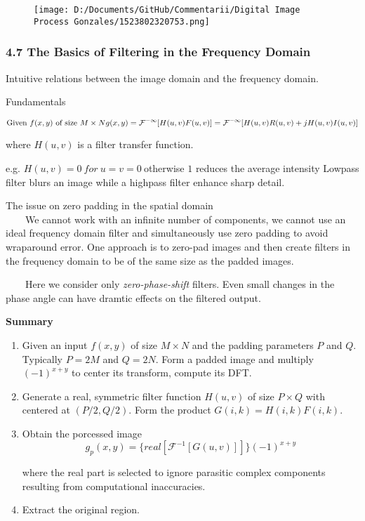 \documentclass[]{article}
\begin{document}
\begin{figure}
\centering
\texttt{[image: D:/Documents/GitHub/Commentarii/Digital Image Process Gonzales/1523802320753.png]}
\caption{}
\end{figure}

\subsubsection{4.7 The Basics of Filtering in the Frequency
Domain}\label{header-n511}

Intuitive relations between the image domain and the frequency domain.

Fundamentals

\[\text{Given $f(x,y)$ of size $M\times N$}\\
g(x,y)=\mathcal{F^{-1}}[H(u,v)F(u,v)]=\mathcal{F^{-1}}[H(u,v)R(u,v)+jH(u,v)I(u,v)]\]

where \(H(u,v)\) is a filter transfer function.

e.g. \(H(u,v)=0\ for\ u=v=0\ \)otherwise \(1\) reduces the average
intensity Lowpass filter blurs an image while a highpass filter enhance
sharp detail.

The issue on zero padding in the spatial domain\\
 \(\quad\quad\)We cannot work with an infinite number of components, we
cannot use an ideal frequency domain filter and simultaneously use zero
padding to avoid wraparound error. One approach is to zero-pad images
and then create filters in the frequency domain to be of the same size
as the padded images.

\(\quad\quad\)Here we consider only \emph{zero-phase-shift} filters.
Even small changes in the phase angle can have dramtic effects on the
filtered output.

\textbf{Summary}\\

\begin{enumerate}
\def\labelenumi{\arabic{enumi}.}
\item
  Given an input \(f(x,y)\) of size \(M\times N\) and the padding
  parameters \(P\) and \(Q\). Typically \(P=2M\) and \(Q=2N\). Form a
  padded image and multiply \((-1)^{x+y}\) to center its transform,
  compute its DFT.
\item
  Generate a real, symmetric filter function \(H(u,v)\) of size
  \(P\times Q\) with centered at \((P/2, Q/2)\). Form the product
  \(G(i,k)=H(i,k)F(i,k)\).
\item
  Obtain the porcessed image \\

  \[g_p (x,y)=\{real[\mathcal{F}^{-1}[G(u,v)]]\}(-1)^{x+y}\]

  where the real part is selected to ignore parasitic complex components
  resulting from computational inaccuracies.
\item
  Extract the original region.
\end{enumerate}
\end{document}
